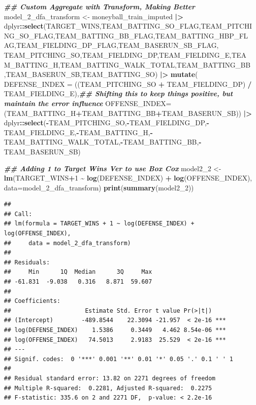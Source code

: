 \documentclass[
]{article}
\newenvironment{Shaded}{\begin{snugshade}}{\end{snugshade}}
\newcommand{\AttributeTok}[1]{\textcolor[rgb]{0.13,0.29,0.53}{#1}}
\newcommand{\DecValTok}[1]{\textcolor[rgb]{0.00,0.00,0.81}{#1}}
\newcommand{\DocumentationTok}[1]{\textcolor[rgb]{0.56,0.35,0.01}{\textbf{\textit{#1}}}}
\newcommand{\FunctionTok}[1]{\textcolor[rgb]{0.13,0.29,0.53}{\textbf{#1}}}
\newcommand{\NormalTok}[1]{#1}
\newcommand{\OtherTok}[1]{\textcolor[rgb]{0.56,0.35,0.01}{#1}}
\newcommand{\SpecialCharTok}[1]{\textcolor[rgb]{0.81,0.36,0.00}{\textbf{#1}}}
\begin{document}
\begin{Shaded}
\begin{Highlighting}[]
\DocumentationTok{\#\# Custom Aggregate with Transform, Making Better}
\NormalTok{model\_2\_dfa\_transform }\OtherTok{\textless{}{-}}\NormalTok{ moneyball\_train\_imputed }\SpecialCharTok{|\textgreater{}} 
\NormalTok{  dplyr}\SpecialCharTok{::}\FunctionTok{select}\NormalTok{(TARGET\_WINS,TEAM\_BATTING\_SO\_FLAG,TEAM\_PITCHING\_SO\_FLAG,TEAM\_BATTING\_BB\_FLAG,TEAM\_BATTING\_HBP\_FLAG,TEAM\_FIELDING\_DP\_FLAG,TEAM\_BASERUN\_SB\_FLAG,}
\NormalTok{         TEAM\_PITCHING\_SO,TEAM\_FIELDING\_DP,TEAM\_FIELDING\_E,TEAM\_BATTING\_H,TEAM\_BATTING\_WALK\_TOTAL,TEAM\_BATTING\_BB,TEAM\_BASERUN\_SB,TEAM\_BATTING\_SO) }\SpecialCharTok{|\textgreater{}}
  \FunctionTok{mutate}\NormalTok{( }\AttributeTok{DEFENSE\_INDEX =}\NormalTok{ ((TEAM\_PITCHING\_SO }\SpecialCharTok{+}\NormalTok{ TEAM\_FIELDING\_DP) }\SpecialCharTok{/}\NormalTok{ TEAM\_FIELDING\_E),}\DocumentationTok{\#\# Shifting this to keep things positive, but maintain the error influence}
         \AttributeTok{OFFENSE\_INDEX=}\NormalTok{(TEAM\_BATTING\_H}\SpecialCharTok{+}\NormalTok{TEAM\_BATTING\_BB}\SpecialCharTok{+}\NormalTok{TEAM\_BASERUN\_SB)) }\SpecialCharTok{|\textgreater{}}
\NormalTok{  dplyr}\SpecialCharTok{::}\FunctionTok{select}\NormalTok{(}\SpecialCharTok{{-}}\NormalTok{TEAM\_PITCHING\_SO,}\SpecialCharTok{{-}}\NormalTok{TEAM\_FIELDING\_DP,}\SpecialCharTok{{-}}\NormalTok{TEAM\_FIELDING\_E,}\SpecialCharTok{{-}}\NormalTok{TEAM\_BATTING\_H,}\SpecialCharTok{{-}}\NormalTok{TEAM\_BATTING\_WALK\_TOTAL,}\SpecialCharTok{{-}}\NormalTok{TEAM\_BATTING\_BB,}\SpecialCharTok{{-}}\NormalTok{TEAM\_BASERUN\_SB)}

\DocumentationTok{\#\# Adding 1 to Target Wins Ver to use Box Cox}
\NormalTok{model2\_2 }\OtherTok{\textless{}{-}} \FunctionTok{lm}\NormalTok{(TARGET\_WINS}\SpecialCharTok{+}\DecValTok{1} \SpecialCharTok{\textasciitilde{}} \FunctionTok{log}\NormalTok{(DEFENSE\_INDEX) }\SpecialCharTok{+} \FunctionTok{log}\NormalTok{(OFFENSE\_INDEX), }\AttributeTok{data=}\NormalTok{model\_2\_dfa\_transform)}
\FunctionTok{print}\NormalTok{(}\FunctionTok{summary}\NormalTok{(model2\_2))}
\end{Highlighting}
\end{Shaded}

\begin{verbatim}
## 
## Call:
## lm(formula = TARGET_WINS + 1 ~ log(DEFENSE_INDEX) + log(OFFENSE_INDEX), 
##     data = model_2_dfa_transform)
## 
## Residuals:
##     Min      1Q  Median      3Q     Max 
## -61.831  -9.038   0.316   8.871  59.607 
## 
## Coefficients:
##                     Estimate Std. Error t value Pr(>|t|)    
## (Intercept)        -489.8544    22.3094 -21.957  < 2e-16 ***
## log(DEFENSE_INDEX)    1.5386     0.3449   4.462 8.54e-06 ***
## log(OFFENSE_INDEX)   74.5013     2.9183  25.529  < 2e-16 ***
## ---
## Signif. codes:  0 '***' 0.001 '**' 0.01 '*' 0.05 '.' 0.1 ' ' 1
## 
## Residual standard error: 13.82 on 2271 degrees of freedom
## Multiple R-squared:  0.2281, Adjusted R-squared:  0.2275 
## F-statistic: 335.6 on 2 and 2271 DF,  p-value: < 2.2e-16
\end{verbatim}
\end{document}
